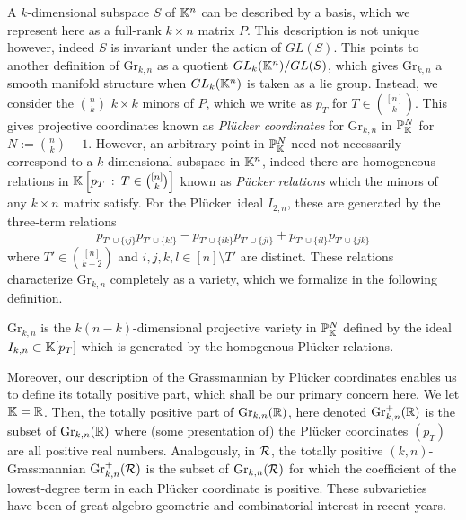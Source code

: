 \documentclass[12pt,letter]{article}
\newcommand{\gr}{\mathrm{Gr}}
\newcommand{\plu}{Pl\"ucker~}
\begin{document}
A $k$-dimensional subspace $S$ of ${\mathbb K}^n$ can be described by a basis, which we represent here as a full-rank $k\times n$ matrix $P$. This description is not unique however, indeed $S$ is invariant under the action of $GL(S)$. This points to another definition of $\gr_{k,n}$ as a quotient $GL_k({\mathbb K}^n)/GL(S)$, which gives $\gr_{k,n}$ a smooth manifold structure when $GL_k({\mathbb K}^n)$ is taken as a lie group. Instead, we consider the $n\choose k$ $k\times k$ minors of $P$, which we write as $p_{T}$ for $T\in {[n]\choose k}$. This gives projective coordinates known as \emph{Pl\"ucker coordinates} for $\gr_{k,n}$ in ${\mathbb P}_{\mathbb K}^N$ for $N:={{n\choose k}-1}$. However, an arbitrary point in ${\mathbb P}_{\mathbb K}^N$ need not necessarily correspond to a $k$-dimensional subspace in ${\mathbb K}^n$, indeed there are homogeneous relations in ${\mathbb K}\left[p_T\::\:T\in {[n]\choose k}\right]$ known as \emph{P\"ucker relations} which the minors of any $k\times n$ matrix satisfy. For the \plu ideal $I_{2,n}$, these are generated by the three-term relations \begin{equation} \label{3texc}p_{T'\cup\{ij\}}p_{T'\cup\{kl\}}-p_{T'\cup\{ik\}}p_{T'\cup\{jl\}}+p_{T'\cup\{il\}}p_{T'\cup\{jk\}}\end{equation}
where $T'\in {[n]\choose k-2}$ and $i,j,k,l\in [n]\setminus T'$ are distinct. These relations characterize $\gr_{k,n}$ completely as a variety, which we formalize in the following definition.
\begin{definition}
	$\gr_{k,n}$ is the $k(n-k)$-dimensional projective variety in ${\mathbb P}_{{\mathbb K}}^{N}$ defined by the ideal  $I_{k,n}\subset {\mathbb K}[p_T]$ which is generated by the homogenous Pl\"ucker relations.
\end{definition}

Moreover, our description of the Grassmannian by Pl\"ucker coordinates enables us to define its totally positive part, which shall be our primary concern here. We let ${\mathbb K}={\mathbb R}$. Then, the totally positive part of $\gr_{k,n} (\RR)$, here denoted $\gr_{k,n}^+(\RR)$ is the subset of $\gr_{k,n}(\RR)$ where (some presentation of) the Pl\"ucker coordinates $(p_T)$ are all positive real numbers. Analogously, in ${\mathcal R}$, the totally positive $(k,n)$-Grassmannian $\gr_{k,n}^+(\Rcal)$ is the subset of $\gr_{k,n}(\Rcal)$ for which the coefficient of the lowest-degree term in each Pl\"ucker coordinate is positive. These subvarieties~ have been of great algebro-geometric and combinatorial interest in recent years.
\end{document}
